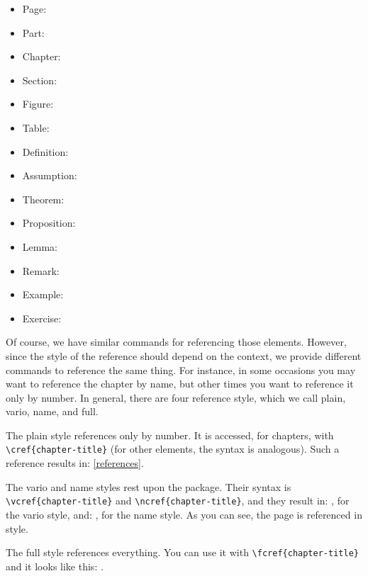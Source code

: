\begin{multicols}{2}
\setlength{\columnseprule}{0pt}
\begin{itemize}
	\item Page: 
	\item Part: 
	\item Chapter: 
	\item Section: 
	\item Figure: 
	\item Table: 
	\item Definition: 
	\item Assumption: 
	\item Theorem: 
	\item Proposition: 
	\item Lemma: 
	\item Remark: 
	\item Example: 
	\item Exercise: 
\end{itemize}
\end{multicols}

Of course, we have similar commands for referencing those elements. 
However, since the style of the reference should depend on the context, 
we provide different commands to reference the same thing. For instance, 
in some occasions you may want to reference the chapter by name, but 
other times you want to reference it only by number. In general, there 
are four reference style, which we call plain, vario, name, and full.

The plain style references only by number. It is accessed, for chapters, 
with \lstinline|\cref{chapter-title}| (for other elements, the syntax 
is analogous). Such a reference results in: \cref{references}.

The vario and name styles rest upon the  package. 
Their syntax is \lstinline|\vcref{chapter-title}| and 
\lstinline|\ncref{chapter-title}|, and they result in: 
, for the vario style, and: , for 
the name style. As you can see, the page is referenced in 
 style.

The full style references everything. You can use it with 
\lstinline|\fcref{chapter-title}| and it looks like this: 
.

